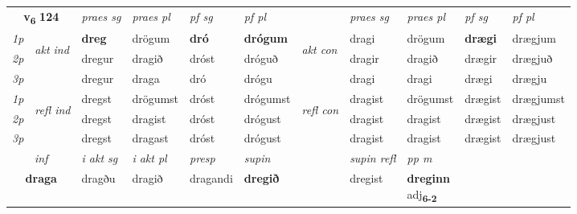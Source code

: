 \noindent
\begin{tabular}{lllllllllll} \toprule
\multicolumn{2}{c}{\textbf{v{\textsubscript{6}}} \Large{\textbf{124}}}  &  \textit{praes sg}  & \textit{praes pl}  &\textit{ pf sg} & \textit{pf pl} &  &  \textit{praes sg}  & \textit{praes pl}  & \textit{pf sg} & \textit{pf pl } \\*
	\cmidrule{3-6} \cmidrule{8-11}
 {\textit{1p}} & \multirow{3}{*}{\begin{turn}{90}\textit{akt ind}\end{turn}} & \textbf{dreg} & drögum & \textbf{dró} & \textbf{drógum} & \multirow{3}{*}{\begin{turn}{90}\textit{akt con}\end{turn}} &dragi & drögum & \textbf{drægi} & drægjum\\*
 {\textit{2p}} &  &  dregur  & dragið & dróst & dróguð & & dragir & dragið & drægir & drægjuð \\*
{\textit{3p}} &  & dregur & draga & dró & drógu & & dragi & dragi& drægi & drægju \\*
\cmidrule{3-6} \cmidrule{8-11}
 {\textit{1p}} & \multirow{3}{*}{\begin{turn}{90}\textit{refl ind}\end{turn}}  & dregst & drögumst & dróst & drógumst & \multirow{3}{*}{\begin{turn}{90}\textit{refl con}\end{turn}}  &dragist & drögumst & drægist & drægjumst \\*
 {\textit{2p}} &  & dregst & dragist & dróst & drógust & &dragist & dragist & drægist & drægjust \\*
 {\textit{3p}}  & & dregst & dragast & dróst & drógust & & dragist & dragist& drægist & drægjust \\*
\cmidrule{3-6} \cmidrule{8-11}

   \multicolumn{2}{c}{\textit{inf}}  & \textit{i akt sg} & \textit{i akt pl}   & \textit{presp} & \textit{supin} && \textit{supin refl} & \textit{pp m} \\*
  \multicolumn{2}{c}{\textbf{draga}} & dragðu  & dragið   & dragandi &  \textbf{dregið} && dregist & \specialcell{\textbf{dreginn} \\ adj\textbf{\textsubscript{6-2}}} \\*
\end{tabular}


